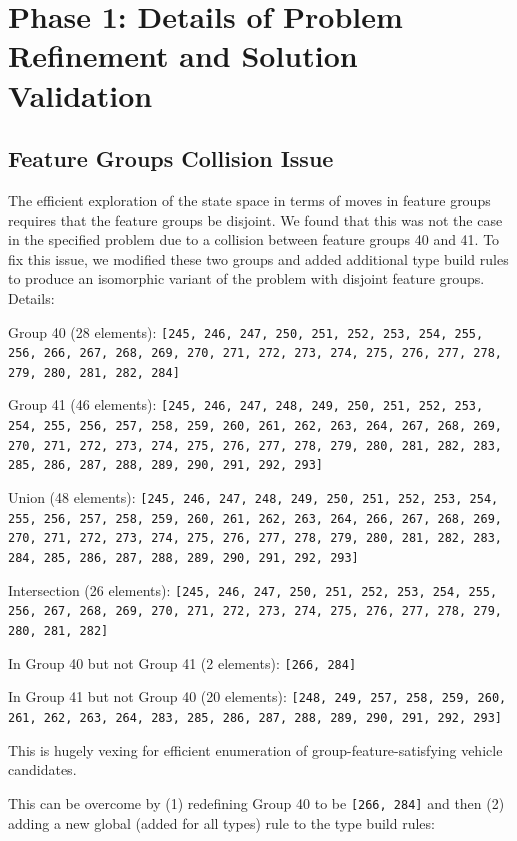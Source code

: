 \documentclass[aps,pra,twocolumn,superscriptaddress,groupedaddress]{revtex4}  %
\begin{document}
\appendix
\newpage
\clearpage

\section{Phase 1: Details of Problem Refinement and Solution Validation}

\subsection{Feature Groups Collision Issue}

The efficient exploration of the state space in terms of moves in feature groups
requires that the feature groups be disjoint. We found that this was not the
case in the specified problem due to a collision between feature groups 40 and
41. To fix this issue, we modified these two groups and added additional type
build rules to produce an isomorphic variant of the problem with disjoint
feature groups. Details:

Group 40 (28 elements): \texttt{[245, 246, 247, 250, 251, 252, 253, 254, 255,
256, 266, 267, 268, 269, 270, 271, 272, 273, 274, 275, 276, 277, 278, 279, 280,
281, 282, 284]}

Group 41 (46 elements): \texttt{[245, 246, 247, 248, 249, 250, 251, 252, 253,
254, 255, 256, 257, 258, 259, 260, 261, 262, 263, 264, 267, 268, 269, 270, 271,
272, 273, 274, 275, 276, 277, 278, 279, 280, 281, 282, 283, 285, 286, 287, 288,
289, 290, 291, 292, 293]}

Union (48 elements): \texttt{[245, 246, 247, 248, 249, 250, 251, 252, 253, 254,
255, 256, 257, 258, 259, 260, 261, 262, 263, 264, 266, 267, 268, 269, 270, 271,
272, 273, 274, 275, 276, 277, 278, 279, 280, 281, 282, 283, 284, 285, 286, 287,
288, 289, 290, 291, 292, 293]}

Intersection (26 elements): \texttt{[245, 246, 247, 250, 251, 252, 253, 254,
255, 256, 267, 268, 269, 270, 271, 272, 273, 274, 275, 276, 277, 278, 279, 280,
281, 282]}

In Group 40 but not Group 41 (2 elements): \texttt{[266, 284]}

In Group 41 but not Group 40 (20 elements): \texttt{[248, 249, 257, 258, 259,
260, 261, 262, 263, 264, 283, 285, 286, 287, 288, 289, 290, 291, 292, 293]}

This is hugely vexing for efficient enumeration of group-feature-satisfying
vehicle candidates.

This can be overcome by (1) redefining Group 40 to be \texttt{[266, 284]} and
then (2) adding a new global (added for all types) rule to the type build rules:
\end{document}
